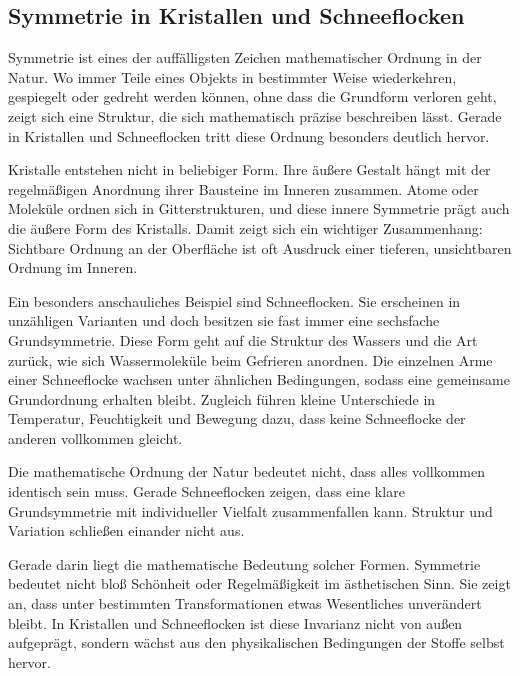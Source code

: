 \subsection{Symmetrie in Kristallen und Schneeflocken}

Symmetrie ist eines der auffälligsten Zeichen mathematischer Ordnung in der Natur.
Wo immer Teile eines Objekts in bestimmter Weise wiederkehren,
gespiegelt
oder gedreht werden können,
ohne dass die Grundform verloren geht,
zeigt sich eine Struktur,
die sich mathematisch präzise beschreiben lässt.
Gerade in Kristallen und Schneeflocken tritt diese Ordnung besonders deutlich hervor.

Kristalle entstehen nicht in beliebiger Form.
Ihre äußere Gestalt hängt mit der regelmäßigen Anordnung ihrer Bausteine im Inneren zusammen.
Atome oder Moleküle ordnen sich in Gitterstrukturen,
und diese innere Symmetrie prägt auch die äußere Form des Kristalls.
Damit zeigt sich ein wichtiger Zusammenhang:
Sichtbare Ordnung an der Oberfläche ist oft Ausdruck einer tieferen,
unsichtbaren Ordnung im Inneren.

Ein besonders anschauliches Beispiel sind Schneeflocken.
Sie erscheinen in unzähligen Varianten
und doch besitzen sie fast immer eine sechsfache Grundsymmetrie.
Diese Form geht auf die Struktur des Wassers
und die Art zurück,
wie sich Wassermoleküle beim Gefrieren anordnen.
Die einzelnen Arme einer Schneeflocke wachsen unter ähnlichen Bedingungen,
sodass eine gemeinsame Grundordnung erhalten bleibt.
Zugleich führen kleine Unterschiede in Temperatur,
Feuchtigkeit
und Bewegung dazu,
dass keine Schneeflocke der anderen vollkommen gleicht.

\begin{DidacticBox}
	Die mathematische Ordnung der Natur bedeutet nicht,
	dass alles vollkommen identisch sein muss.
	Gerade Schneeflocken zeigen,
	dass eine klare Grundsymmetrie mit individueller Vielfalt zusammenfallen kann.
	Struktur und Variation schließen einander nicht aus.
\end{DidacticBox}

Gerade darin liegt die mathematische Bedeutung solcher Formen.
Symmetrie bedeutet nicht bloß Schönheit oder Regelmäßigkeit im ästhetischen Sinn.
Sie zeigt an,
dass unter bestimmten Transformationen etwas Wesentliches unverändert bleibt.
In Kristallen und Schneeflocken ist diese Invarianz nicht von außen aufgeprägt,
sondern wächst aus den physikalischen Bedingungen der Stoffe selbst hervor.

